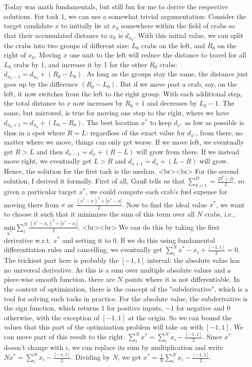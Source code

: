 Today was math fundamentals, but still fun for me to derive the respective solutions. For task 1, we can use a somewhat trivial argumentation: Consider the target candidate $x$ to initially lie at $x_0$ somewhere within the field of crabs so that their accumulated distance to $x_0$ is $d_{x_0}$. With this initial value, we can split the crabs into two groups of different size: $L_0$ crabs on the left, and $R_0$ on the right of $x_0$. Moving $x$ one unit to the left will reduce the distance to travel for all $L_0$ crabs by $1$, and increase it by 1 for the other $R_0$ crabs: $d_{x_{0}-1} = d_{x_0}+(R_0-L_0)$. As long as the groups stay the same, the distance just goes up by the difference $(R_0-L_0)$. But if we move past a crab, say, on the left, it now switches from the left to the right group. With each additional step, the total distance to $x$ now increases by $R_0+1$ and decreases by $L_0-1$. The same, but mirrored, is true for moving one step to the right, where we have $d_{x_{0}+1} = d_{x_0}+(L_0-R_0)$. The best location $x^\ast$ to keep $d_{x^\ast}$ as low as possible is thus in a spot where $R = L$: regardless of the exact value for $d_{x^\ast}$, from there, no matter where we move, things can only get worse. If we move left, we eventually get $R > L$ and then $d_{x - 1} = d_{x}+(R-L)$ will grow from there. If we instead move right, we eventually get $L > R$ and $d_{x+1} = d_{x}+(L-R)$ will grow. Hence, the solution for the first task is the median.
<br><br>
For the second solution, I derived it formally. First of all, Gauß tells us that $\sum_{d=1}^D = \frac{D^2 +D}{2}$, so given a particular target $x^\ast$, we could compute each crab's fuel expense for moving there from $x$ as $\frac{(x^\ast-x)^2 + |x^\ast-x|}{2}$. Now to find the ideal value $x^\ast$, we want to choose it such that it minimizes the sum of this term over all $N$ crabs, i.e., $\underset{x^\ast}{\text{min}} \sum_i^N \frac{(x^\ast-x_i)^2 + |x^\ast-x_i|}{2}$. 
<br><br>
We can do this by taking the first derivative w.r.t. $x^\ast$ and setting it to 0. If we do this using fundamental differentiation rules and cancelling, we eventually get $\sum_i^N x^\ast - x_i + \frac{[-1,1]}{2} = 0$. The trickiest part here is probably the $[-1,1]$ interval: the absolute value has no universal derivative. As this is a sum over multiple absolute values and a piece-wise smooth function, there are $N$ points where it is not differentiable. In the context of optimization, there is the concept of the "subderivative", which is a tool for solving such tasks in practice. For the absolute value, the subderivative is the sign function, which returns $1$ for positive inputs, $-1$ for negative and $0$ otherwise, with the exception of $[-1,1]$ at the origin. So we can bound the values that this part of the optimization problem will take on with $[-1,1]$. We can move part of this result to the right: $\sum_i^N x^\ast = \sum_i^N x_i - \frac{ [-1,1] }{2}$. Since $x^\ast$ doesn't change with $i$, we can replace its sum by multiplication and write $N x^\ast = \sum_i^N x_i - \frac{[-1,1]}{2}$. Dividing by $N$, we get $x^\ast = \frac{1}{N} \sum_i^N x_i - \frac{[-1,1]}{2}$. 
